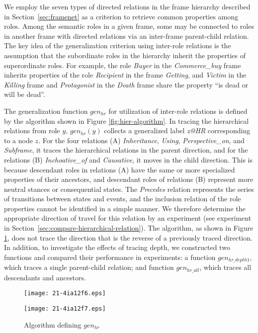 \documentclass[english]{jnlp_1.4_rep}
\begin{document}
We employ the seven types of directed relations in the frame hierarchy described in Section~\ref{sec:framenet} as a criterion to retrieve common properties among roles. Among the semantic roles in a given frame, some may be connected to roles in another frame with directed relations via an inter-frame parent-child relation.
The key idea of the generalization criterion using inter-role relations is the assumption that
the subordinate roles in the hierarchy inherit the properties of superordinate roles. For example, the role {\it Buyer} in the {\it Commerce\_buy} frame inherits properties of the role {\it Recipient} in the frame {\it Getting}, and {\it Victim} in the {\it Killing} frame and {\it Protagonist} in the {\it Death} frame share the property ``is dead or will be dead''.

The generalization function $gen_{hr}$ for utilization of inter-role relations is defined by the algorithm shown in Figure \ref{fig:hier-algorithm}. In tracing the hierarchical relations from role $y$, $gen_{hr}(y)$ collects a generalized label {\it z@HR} corresponding to a node $z$. For the four relations (A) {\it Inheritance}, {\it Using}, {\it Perspective\_on}, and {\it Subframe}, it traces the hierarchical relations in the parent direction, and for the relations (B) {\it Inchoative\_of} and {\it Causative}, it moves in the child direction.
This is because descendant roles in relations (A) have the same or more specialized
properties of their ancestors, and descendant roles of relations (B) represent more
neutral stances or consequential states.
The {\it Precedes} relation represents the series of transitions between states and events, and the inclusion relation of the role properties cannot be identified in a simple manner. We therefore determine the appropriate direction of travel for this relation by an experiment (see experiment in Section~\ref{sec:compare-hierarchical-relation}). The algorithm, as shown in Figure \ref{fig:hier-figure}, does not trace the direction that is the reverse of a previously traced direction.
In addition, to investigate the effects of tracing depth, we constructed two functions and compared their performance in experiments: a function $gen_{hr\_depth1}$, which traces a single parent-child relation; and function $gen_{hr\_all}$, which traces all descendants and ancestors.

\begin{figure}[t]
\begin{minipage}[t]{225.5pt}
\begin{center}
\texttt{[image: 21-4ia12f6.eps]}
\end{center}
\caption{Algorithm defining $gen_{hr}$}
\label{fig:hier-algorithm}
\end{minipage}
\begin{minipage}[t]{194.5pt}
\setlength{\captionwidth}{194.5pt}
\begin{center}
\texttt{[image: 21-4ia12f7.eps]}
\end{center}
\label{fig:hier-figure}
\end{minipage}
\end{figure}
\end{document}
